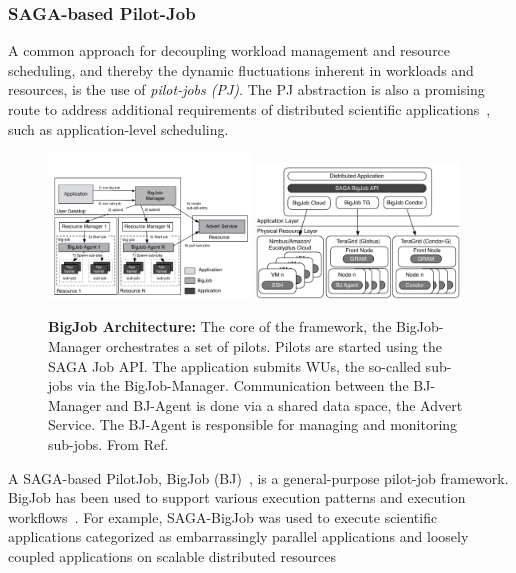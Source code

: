 \documentclass[]{svjour3}
\begin{document}
\subsubsection{SAGA-based Pilot-Job}

A common approach for decoupling workload management and resource
scheduling, and thereby the dynamic fluctuations inherent in workloads
and resources, is the use of \emph{pilot-jobs (PJ)}. The PJ abstraction is also a
promising route to address additional requirements of distributed scientific
applications~\cite{ko-efficient,bigjob_cloudcom10}, such as application-level scheduling.
 
\begin{figure}[t]
 \centering
  \includegraphics[width=0.48\textwidth]{figures/re_bigjob_interactions.pdf}
 \includegraphics[width=0.48\textwidth]{figures/distributed_pilot_job.pdf}

    \caption{\textbf{BigJob Architecture:} The core of the
     framework, the BigJob-Manager orchestrates a set of
     pilots. Pilots are started using the SAGA Job API. The
     application submits WUs, the so-called sub-jobs via the
     BigJob-Manager. Communication between the BJ-Manager and
     BJ-Agent is done via a shared data space, the Advert
     Service. The BJ-Agent is responsible for managing and
     monitoring sub-jobs. From
     Ref.~\cite{saga_bigjob_condor_cloud}}
    \label{fig:figures_re_bigjob_interactions}
\end{figure}

A SAGA-based PilotJob, BigJob (BJ)~\cite{bigjob_web,saga_bigjob_condor_cloud}, is a
general-purpose pilot-job framework. BigJob has been used to support various
execution patterns and execution workflows~\cite{async_repex11,saga-royalsoc}.
For example, SAGA-BigJob was used to execute scientific
applications categorized as embarrassingly parallel applications and
loosely coupled applications on scalable distributed
resources~\cite{ecmls_ccpe10, dare-ecmls11}
\end{document}
